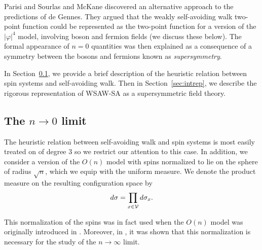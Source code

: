 Parisi and Sourlas \cite{PS80} and McKane \cite{McKa80} discovered
an alternative approach to the predictions of de Gennes. They argued that the weakly
self-avoiding walk two-point function could be represented as the two-point function
for a version of the $|\varphi|^4$ model, involving boson and
fermion fields (we discuss these below). The formal appearance of $n = 0$ quantities
was then explained as a consequence of a symmetry between the bosons and fermions known
as \emph{supersymmetry}.

In Section~\ref{sec:ntozero}, we provide a brief description of the heuristic
relation between spin systems and self-avoiding walk. Then in Section~\ref{sec:intrep},
we describe the rigorous representation of WSAW-SA as a supersymmetric field
theory.


\subsection{The \texorpdfstring{$n\to0$}{n approaches 0} limit}
\label{sec:ntozero}

The heuristic relation between self-avoiding walk and spin systems is most easily
treated on  of degree $3$
so we restrict our attention to this case. In
addition, we consider a version of the $O(n)$ model with spins normalized to
lie on the sphere of radius $\sqrt n$, which we equip with the uniform measure.
We denote the product measure on the resulting configuration space by
\begin{equation}
d\sigma = \prod_{x\in\mathcal{V}} d\sigma_x.
\end{equation}

\begin{rk}
This normalization of the spins was in fact used when the $O(n)$ model was originally
introduced in \cite{Stanley68}. Moreover, in \cite{KT71}, it was shown that this
normalization is necessary for the study of the $n\to\infty$ limit.
\end{rk}

